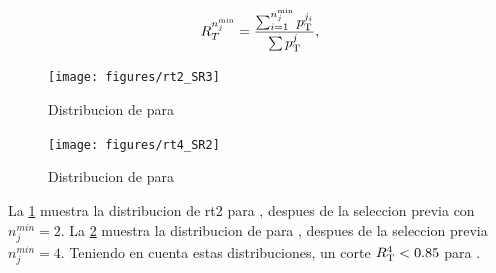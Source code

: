 
\begin{equation}\label{eq:rt_formula}
  R_{T}^{n_{j}^{\min}} = \frac{\sum_{i=1}^{n_{j}^{\min}}p_{\rm T}^{j_i}}{\sum p_{\rm T}^{j}},
\end{equation}




\begin{figure}[th!]
  \centering
  \texttt{[image: figures/rt2\_SR3]}
  \caption{Distribucion de {\rtt} para {\SRH}}
  \label{fig:RT2_3SR}
\end{figure}

\begin{figure}[th!]
  \centering
  \texttt{[image: figures/rt4\_SR2]}
  \caption{Distribucion de {\rt} para {\SRL}}
  \label{fig:RT4_3SR}
\end{figure}

La {\fig} \ref{fig:RT2_3SR} muestra la distribucion de rt2 para {\SRH}, despues de la seleccion previa con $n_{j}^{min}=2$. %
La {\fig} \ref{fig:RT4_3SR} muestra la distribucion de {\rt} para {\SRL}, despues de la seleccion previa $n_{j}^{min} = 4$.
Teniendo en cuenta estas distribuciones, un corte $R_{\mathrm{T}}^{4} < 0.85$ para {\SRL}.

